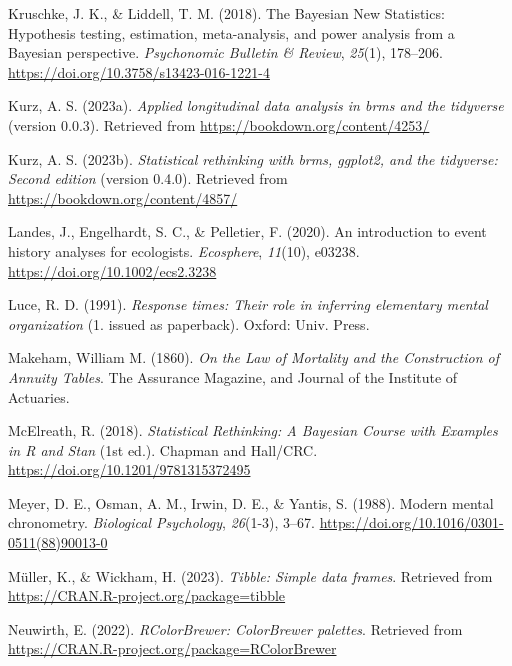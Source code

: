 \documentclass[
  man, donotrepeattitle,floatsintext]{apa6}
\newlength{\cslhangindent}
\newenvironment{CSLReferences}[2] %
 {\begin{list}{}{%
  \setlength{\itemindent}{0pt}
  \setlength{\leftmargin}{0pt}
  \setlength{\parsep}{0pt}
  \ifodd #1
   \setlength{\leftmargin}{\cslhangindent}
   \setlength{\itemindent}{-1\cslhangindent}
  \fi
  \setlength{\itemsep}{#2\baselineskip}}}
 {\end{list}}
\begin{document}
\begin{CSLReferences}{1}{0}
Kruschke, J. K., \& Liddell, T. M. (2018). The {Bayesian New Statistics}: {Hypothesis} testing, estimation, meta-analysis, and power analysis from a {Bayesian} perspective. \emph{Psychonomic Bulletin \& Review}, \emph{25}(1), 178--206. \url{https://doi.org/10.3758/s13423-016-1221-4}

Kurz, A. S. (2023a). \emph{Applied longitudinal data analysis in brms and the tidyverse} (version 0.0.3). Retrieved from \url{https://bookdown.org/content/4253/}

Kurz, A. S. (2023b). \emph{Statistical rethinking with brms, ggplot2, and the tidyverse: {Second} edition} (version 0.4.0). Retrieved from \url{https://bookdown.org/content/4857/}

Landes, J., Engelhardt, S. C., \& Pelletier, F. (2020). An introduction to event history analyses for ecologists. \emph{Ecosphere}, \emph{11}(10), e03238. \url{https://doi.org/10.1002/ecs2.3238}

Luce, R. D. (1991). \emph{Response times: Their role in inferring elementary mental organization} (1. issued as paperback). Oxford: Univ. Press.

Makeham, William M. (1860). \emph{On the {Law} of {Mortality} and the {Construction} of {Annuity Tables}}. {The Assurance Magazine, and Journal of the Institute of Actuaries}.

McElreath, R. (2018). \emph{Statistical {Rethinking}: {A Bayesian Course} with {Examples} in {R} and {Stan}} (1st ed.). {Chapman and Hall/CRC}. \url{https://doi.org/10.1201/9781315372495}

Meyer, D. E., Osman, A. M., Irwin, D. E., \& Yantis, S. (1988). Modern mental chronometry. \emph{Biological Psychology}, \emph{26}(1-3), 3--67. \url{https://doi.org/10.1016/0301-0511(88)90013-0}

Müller, K., \& Wickham, H. (2023). \emph{Tibble: Simple data frames}. Retrieved from \url{https://CRAN.R-project.org/package=tibble}

Neuwirth, E. (2022). \emph{RColorBrewer: ColorBrewer palettes}. Retrieved from \url{https://CRAN.R-project.org/package=RColorBrewer}


\end{CSLReferences}
\end{document}
